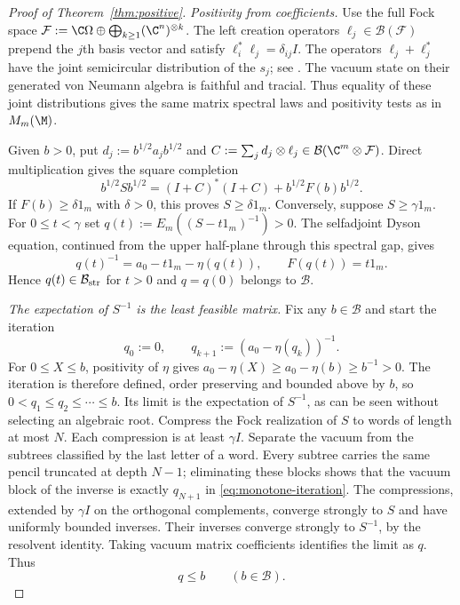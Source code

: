 \begin{proof}[Proof of Theorem~\ref{thm:positive}]
\emph{Positivity from coefficients.}
Use the full Fock space $\mathcal F:=\C\Omega\oplus\bigoplus_{k\ge1}(\C^n)^{\otimes k}$.
The left creation operators $\ell_j\in\mathcal B(\mathcal F)$ prepend the $j$th basis vector and satisfy $\ell_i^*\ell_j=\delta_{ij}I$.
The operators $\ell_j+\ell_j^*$ have the joint semicircular distribution of the $s_j$; see \cite[Section 2.1, pp.~3--5]{Miy22}.
The vacuum state on their generated von Neumann algebra is faithful and tracial.
Thus equality of these joint distributions gives the same matrix spectral laws and positivity tests as in $M_m(\M)$.

Given $b>0$, put $d_j:=b^{1/2}a_jb^{1/2}$ and $C:=\sum_jd_j\otimes\ell_j\in\mathcal B(\C^m\otimes\mathcal F)$.
Direct multiplication gives the square completion
\begin{equation}\label{eq:fock-square}
 b^{1/2}Sb^{1/2}=(I+C)^*(I+C)+b^{1/2}F(b)b^{1/2}.
\end{equation}
If $F(b)\ge\delta 1_m$ with $\delta>0$, this proves $S\ge\delta 1_m$.
Conversely, suppose $S\ge\gamma 1_m$.
For $0\le t<\gamma$ set $q(t):=E_m((S-t1_m)^{-1})>0$.
The selfadjoint Dyson equation, continued from the upper half-plane through this spectral gap, gives
\begin{equation}\label{eq:gap-dyson}
 q(t)^{-1}=a_0-t1_m-\eta(q(t)),\qquad F(q(t))=t1_m.
\end{equation}
Hence $q(t)\in\mathcal B_{\rm str}$ for $t>0$ and $q=q(0)$ belongs to $\mathcal B$.

\emph{The expectation of $S^{-1}$ is the least feasible matrix.}
Fix any $b\in\mathcal B$ and start the iteration
\begin{equation}\label{eq:monotone-iteration}
 q_0:=0,\qquad q_{k+1}:=(a_0-\eta(q_k))^{-1}.
\end{equation}
For $0\le X\le b$, positivity of $\eta$ gives $a_0-\eta(X)\ge a_0-\eta(b)\ge b^{-1}>0$.
The iteration is therefore defined, order preserving and bounded above by $b$, so $0<q_1\le q_2\le\cdots\le b$.
Its limit is the expectation of $S^{-1}$, as can be seen without selecting an algebraic root.
Compress the Fock realization of $S$ to words of length at most $N$.
Each compression is at least $\gamma I$.
Separate the vacuum from the subtrees classified by the last letter of a word.
Every subtree carries the same pencil truncated at depth $N-1$; eliminating these blocks shows that the vacuum block of the inverse is exactly $q_{N+1}$ in \eqref{eq:monotone-iteration}.
The compressions, extended by $\gamma I$ on the orthogonal complements, converge strongly to $S$ and have uniformly bounded inverses.
Their inverses converge strongly to $S^{-1}$, by the resolvent identity.
Taking vacuum matrix coefficients identifies the limit as $q$.
Thus
\begin{equation}\label{eq:least-feasible}
 q\le b\qquad(b\in\mathcal B).
\end{equation}


\end{proof}

